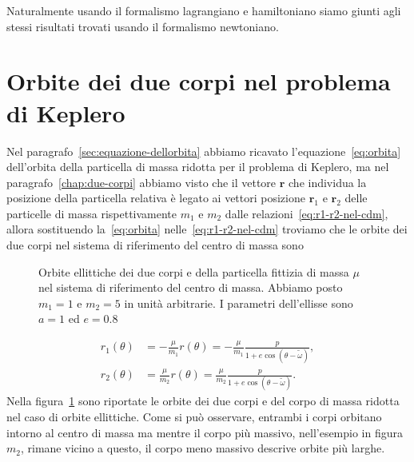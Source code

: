 Naturalmente usando il formalismo lagrangiano e hamiltoniano siamo giunti agli
stessi risultati trovati usando il formalismo newtoniano.

\section{Orbite dei due corpi nel problema di Keplero}
\label{sec:orbite-corpi}

Nel paragrafo~\ref{sec:equazione-dellorbita} abbiamo ricavato
l'equazione~\eqref{eq:orbita} dell'orbita della particella di massa ridotta per
il problema di Keplero, ma nel paragrafo~\ref{chap:due-corpi} abbiamo visto che
il vettore $\bm{r}$ che individua la posizione della particella relativa è
legato ai vettori posizione $\bm{r}_1$ e $\bm{r}_2$ delle particelle di massa
rispettivamente $m_1$ e $m_2$ dalle relazioni~\eqref{eq:r1-r2-nel-cdm}, allora
sostituendo la~\eqref{eq:orbita} nelle~\eqref{eq:r1-r2-nel-cdm} troviamo che le
orbite dei due corpi nel sistema di riferimento del centro di massa sono
\begin{figure}
  \centering
  
  \caption[Orbite dei due corpi]{Orbite ellittiche dei due corpi e della
    particella fittizia di massa $\mu$ nel sistema di riferimento del centro di
    massa. Abbiamo posto $m_1=1$ e $m_2=5$ in unità arbitrarie. I parametri
    dell'ellisse sono $a=1$ ed $e=0.8$}
  \label{fig:orbite-ellittiche}
\end{figure}
\begin{subequations}
  \begin{align}
    r_1(\theta) &= -\frac{\mu}{m_1}r(\theta) =
    -\frac{\mu}{m_1}\frac{p}{1+e\cos(\theta - \tilde\omega)},\\
    r_2(\theta) &= \frac{\mu}{m_2}r(\theta) =
    \frac{\mu}{m_2}\frac{p}{1+e\cos(\theta - \tilde\omega)}.
  \end{align}
\end{subequations}
Nella figura~\ref{fig:orbite-ellittiche} sono riportate le orbite dei due corpi
e del corpo di massa ridotta nel caso di orbite ellittiche. Come si può
osservare, entrambi i corpi orbitano intorno al centro di massa ma mentre il
corpo più massivo, nell'esempio in figura $m_2$, rimane vicino a questo, il
corpo meno massivo descrive orbite più larghe.

